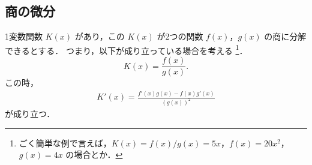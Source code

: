 \subsection{商の微分}
    1変数関数 $K(x)$ があり，この $K(x)$ が2つの関数 $f(x)$，$g(x)$ の商に分解できるとする．
    つまり，以下が成り立っている場合を考える
        \footnote{
            ごく簡単な例で言えば，$K(x)=f(x)/g(x)=5x$，$f(x)=20{x}^{2}$，$g(x)=4x$ の場合とか．
        }．
        \begin{equation*}
            K(x) = \frac{f(x)}{g(x)}.
        \end{equation*}
    この時，
         \begin{align}
             K'(x) = \frac{f'(x)g(x) - f(x)g'(x)}{{\left(g(x)\right)}^{2}}
         \end{align}
    が成り立つ．

